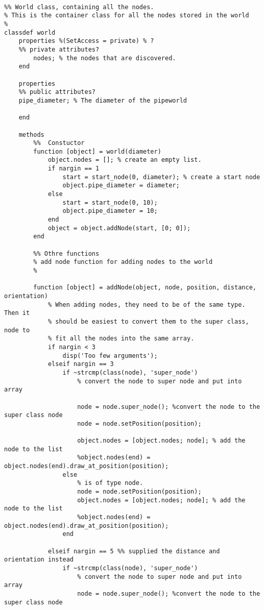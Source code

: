 \begin{lstlisting}

%% World class, containing all the nodes. 
% This is the container class for all the nodes stored in the world
% 
classdef world
    properties %(SetAccess = private) % ?
    %% private attributes?
        nodes; % the nodes that are discovered. 
    end
    
    properties
    %% public attributes?
    pipe_diameter; % The diameter of the pipeworld
    
    end
    
    methods
        %%  Constuctor
        function [object] = world(diameter)
            object.nodes = []; % create an empty list.
            if nargin == 1
                start = start_node(0, diameter); % create a start node
                object.pipe_diameter = diameter;
            else
                start = start_node(0, 10);
                object.pipe_diameter = 10;
            end
            object = object.addNode(start, [0; 0]);
        end
        
        %% Othre functions
        % add node function for adding nodes to the world
        % 
        
        function [object] = addNode(object, node, position, distance, orientation)        
            % When adding nodes, they need to be of the same type. Then it
            % should be easiest to convert them to the super class, node to
            % fit all the nodes into the same array.
            if nargin < 3
                disp('Too few arguments');
            elseif nargin == 3
                if ~strcmp(class(node), 'super_node')
                    % convert the node to super node and put into array
                    
                    node = node.super_node(); %convert the node to the super class node
                    node = node.setPosition(position);
                    
                    object.nodes = [object.nodes; node]; % add the node to the list
                    %object.nodes(end) = object.nodes(end).draw_at_position(position);
                else
                    % is of type node.
                    node = node.setPosition(position);
                    object.nodes = [object.nodes; node]; % add the node to the list
                    %object.nodes(end) = object.nodes(end).draw_at_position(position);
                end
                
            elseif nargin == 5 %% supplied the distance and orientation instead
                if ~strcmp(class(node), 'super_node')
                    % convert the node to super node and put into array
                    node = node.super_node(); %convert the node to the super class node
                    

\end{lstlisting}
